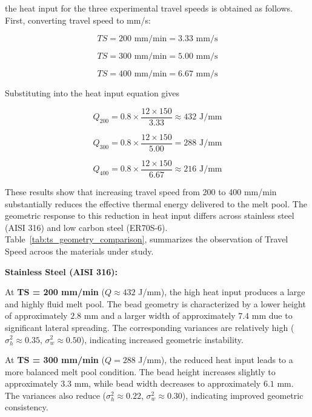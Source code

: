 \documentclass[conference]{IEEEtran}
\begin{document}
the heat input for the three experimental travel speeds is obtained as follows. First, converting travel speed to mm/s:

\begin{equation}
TS = 200 \text{ mm/min} = 3.33 \text{ mm/s}
\end{equation}

\begin{equation}
TS = 300 \text{ mm/min} = 5.00 \text{ mm/s}
\end{equation}

\begin{equation}
TS = 400 \text{ mm/min} = 6.67 \text{ mm/s}
\end{equation}

Substituting into the heat input equation gives

\begin{equation}
Q_{200} = 0.8 \times \frac{12 \times 150}{3.33} \approx 432 \text{ J/mm}
\end{equation}

\begin{equation}
Q_{300} = 0.8 \times \frac{12 \times 150}{5.00} = 288 \text{ J/mm}
\end{equation}

\begin{equation}
Q_{400} = 0.8 \times \frac{12 \times 150}{6.67} \approx 216 \text{ J/mm}
\end{equation}

These results show that increasing travel speed from 200 to 400 mm/min substantially reduces the effective thermal energy delivered to the melt pool. The geometric response to this reduction in heat input differs across stainless steel (AISI 316) and low carbon steel (ER70S-6). Table~\ref{tab:ts_geometry_comparison}, summarizes the observation of Travel Speed acroos the materials under study.


\textbf{Stainless Steel (AISI 316):}

At \textbf{TS = 200 mm/min} ($Q \approx 432$ J/mm), the high heat input produces a large and highly fluid melt pool. The bead geometry is characterized by a lower height of approximately $2.8$ mm and a larger width of approximately $7.4$ mm due to significant lateral spreading. The corresponding variances are relatively high ($\sigma_h^2 \approx 0.35$, $\sigma_w^2 \approx 0.50$), indicating increased geometric instability.

At \textbf{TS = 300 mm/min} ($Q = 288$ J/mm), the reduced heat input leads to a more balanced melt pool condition. The bead height increases slightly to approximately $3.3$ mm, while bead width decreases to approximately $6.1$ mm. The variances also reduce ($\sigma_h^2 \approx 0.22$, $\sigma_w^2 \approx 0.30$), indicating improved geometric consistency.
\end{document}
